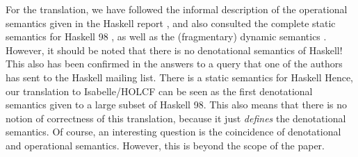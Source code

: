 \documentclass{llncs}
\begin{document}
For the translation, we have followed the informal description of the
operational semantics given in the Haskell report \cite{HaskellRep},
and also consulted the complete static semantics for Haskell 98
\cite{journals/jfp/Faxen02}, as well as the (fragmentary) dynamic
semantics \cite{oai:CiteSeerPSU:71374}.  However, it should be noted
that there is no denotational semantics of Haskell! This also has been
confirmed in the answers to a query that one of the authors has sent
to the Haskell mailing list.  There is a static semantics for Haskell
Hence, our translation to Isabelle/HOLCF can be seen as the first 
denotational semantics given to a large subset of Haskell 98.
This also means that there is no notion of correctness of this
translation, because it just \emph{defines} the denotational semantics.
Of course, an interesting question is the coincidence of 
denotational and operational semantics. However, this is beyond the
scope of the paper.






\end{document}
